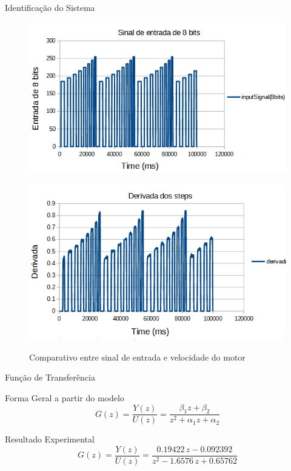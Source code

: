 \documentclass{beamer}
\begin{document}
\begin{frame}{Identificação do Sistema}
\begin{figure}
    \centering
    \includegraphics[width = 0.5\linewidth]{sinal_8_bits.PNG}
    \label{fig:control_1}
\end{figure}
\begin{figure}
    \centering
    \includegraphics[width = 0.5\linewidth]{derivada_steps.PNG}
    \label{fig:control_1}
    \caption{Comparativo entre sinal de entrada e velocidade do motor}
\end{figure}
\end{frame}

\begin{frame}{Função de Transferência}
    \begin{block}{Forma Geral a partir do modelo}
        \begin{equation}\label{eq:gz_general}
            G(z) = \frac{Y(z)}{U(z)} = \frac{\beta_1 z + \beta_2}{z^2 + \alpha_1 z + \alpha_2}
        \end{equation}
    \end{block}
    
    \begin{block}{Resultado Experimental}
        \begin{equation}
        G(z) = \frac{Y(z)}{U(z)} = \frac{0.19422\,z-0.092392}{z^2-1.6576\,z+0.65762}
        \label{transfdisc}
        \end{equation}
    \end{block}
\end{frame}
\end{document}

